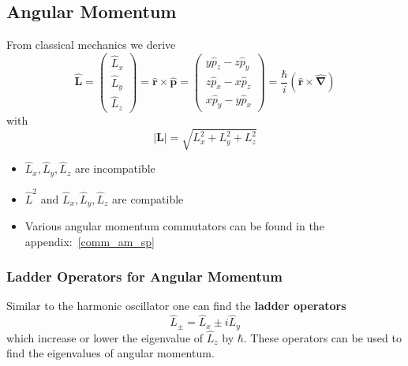 \subsection{Angular Momentum}


From classical mechanics we derive
\begin{equation*}
    \widehat{\mathbf{L}}=
    \begin{pmatrix}
        \widehat{L}_x \\
        \widehat{L}_y \\
        \widehat{L}_z
    \end{pmatrix}
    =\widehat{\mathbf{r}}\times\widehat{\mathbf{p}}
    =
    \begin{pmatrix}
        y\widehat{p}_z-z\widehat{p}_y \\
        z\widehat{p}_x-x\widehat{p}_z \\
        x\widehat{p}_y-y\widehat{p}_x
    \end{pmatrix}
    =\frac{\hbar}{i}(\mathbf{\widehat{r}}\times\widehat{\mathbf{\nabla}})
\end{equation*}
with
\begin{equation*}
    |\mathbf{L}|=\sqrt{L_{x}^{2}+L_{y}^{2}+L_{z}^{2}}
\end{equation*}


\begin{itemize}
    \item $\widehat{L}_x, \widehat{L}_y, \widehat{L}_z$ are incompatible
    \item $\widehat{L}^2$ and $\widehat{L}_x, \widehat{L}_y, \widehat{L}_z$ are compatible
    \item Various angular momentum commutators can be found in the appendix:\ \ref{comm_am_sp}
\end{itemize}

\subsubsection{Ladder Operators for Angular Momentum}

Similar to the harmonic oscillator one can find the \textbf{ladder operators}
\begin{equation*}
    \widehat{L}_{\pm}=\widehat{L}_x\pm i \widehat{L}_y
\end{equation*}
which increase or lower the eigenvalue of $\widehat{L}_z$ by $\hbar$. These operators can be used to find the eigenvalues of angular momentum.

